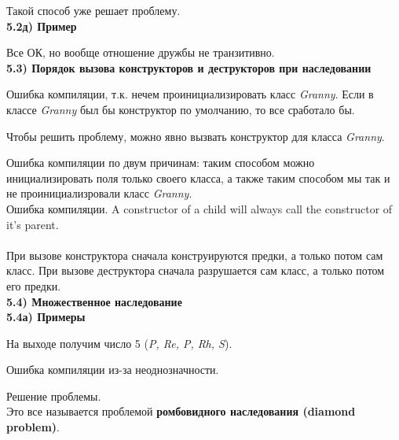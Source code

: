 \documentclass{article}
\begin{document}
Такой способ уже решает проблему.\\
\noindent \textbf{5.2д) Пример}

Все ОК, но вообще отношение дружбы не транзитивно.\\
\noindent \textbf{5.3) Порядок вызова конструкторов и деструкторов при наследовании}

Ошибка компиляции, т.к. нечем проинициализировать класс \textit{Granny}. Если в классе \textit{Granny} был бы конструктор по умолчанию, то все сработало бы. 

Чтобы решить проблему, можно явно вызвать конструктор для класса \textit{Granny}.
	
Ошибка компиляции по двум причинам: таким способом можно инициализировать поля только своего класса, а также таким способом мы так и не проинициализровали класс \textit{Granny}. \\

Ошибка компиляции. A constructor of a child will always call the constructor of it's parent.\\\\
При вызове конструктора сначала конструируются предки, а только потом сам класс. При вызове деструктора сначала разрушается сам класс, а только потом его предки.\\
\noindent \textbf{5.4) Множественное наследование}\\
\noindent \textbf{5.4а) Примеры}

На выходе получим число 5 (\textit{P, Re, P, Rh, S}).

Ошибка компиляции из-за неоднозначности.

Решение проблемы.\\
Это все называется проблемой \textbf{ромбовидного наследования (diamond problem)}.
\end{document}
